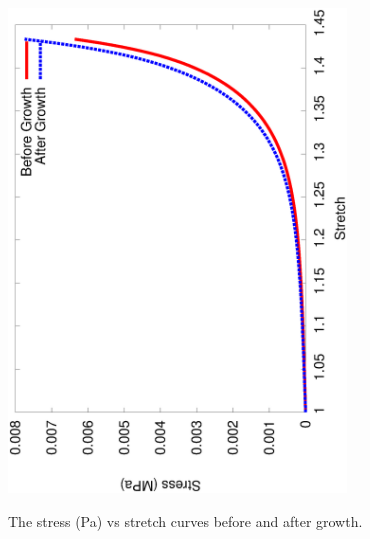 \begin{figure}[!hpt]
  \centering
     {\includegraphics[angle=270,width=0.8\textwidth]{images/examples/lagrangian/swelling/stress-stretch}}
     \caption{The stress (Pa) vs stretch curves before and after
       growth.}
     \label{stress_strain}
\end{figure}

